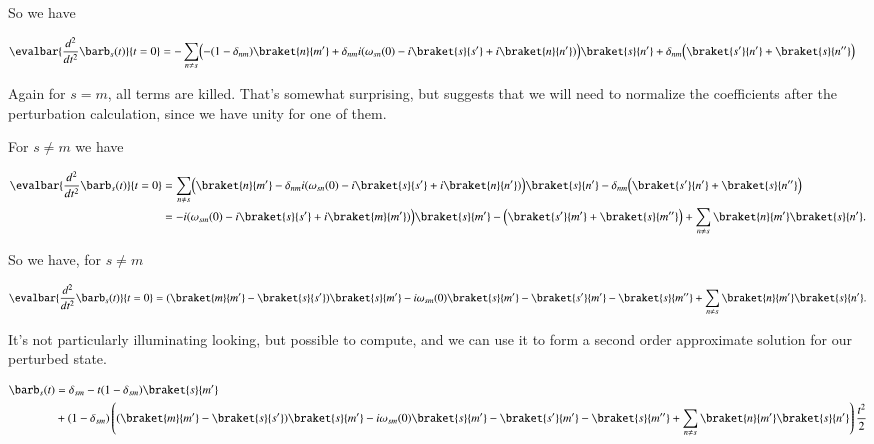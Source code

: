 So we have

\begin{align*}
\evalbar{\frac{d^2}{dt^2} \barb_s(t)}{t=0} 
&= - \sum_{n \ne s} 
\Bigl(
- (1 - \delta_{nm}) \braket{n}{m'}
+
\delta_{nm} i 
(
\omega_{sn}(0) - i\braket{s}{s'} + i\braket{n}{n'}
)
\Bigr)
\braket{s}{n'}
+\delta_{nm} 
\Bigl( 
\braket{s'}{n'}
+\braket{s}{n''}
\Bigr)
\end{align*}

Again for $s = m$, all terms are killed.  That's somewhat surprising, but suggests that we will need to normalize the coefficients after the perturbation calculation, since we have unity for one of them.

For $s \ne m$ we have

\begin{align*}
\evalbar{\frac{d^2}{dt^2} \barb_s(t)}{t=0} 
&= \sum_{n \ne s} 
\Bigl(
\braket{n}{m'}
-
\delta_{nm} i 
(
\omega_{sn}(0) - i\braket{s}{s'} + i\braket{n}{n'}
)
\Bigr)
\braket{s}{n'}
-\delta_{nm} 
\Bigl( 
\braket{s'}{n'}
+\braket{s}{n''}
\Bigr) \\
&= 
-
i 
(
\omega_{sm}(0) - i\braket{s}{s'} + i\braket{m}{m'}
)
\Bigr)
\braket{s}{m'}
-
\Bigl( 
\braket{s'}{m'}
+\braket{s}{m''}
\Bigr) 
+
\sum_{n \ne s} 
\braket{n}{m'} \braket{s}{n'}.
\end{align*}

So we have, for $s \ne m$ 

\begin{equation}\label{eqn:adiabaticApprox:330}
\evalbar{\frac{d^2}{dt^2} \barb_s(t)}{t=0} 
= 
(\braket{m}{m'} - \braket{s}{s'} ) \braket{s}{m'}
-i \omega_{sm}(0) \braket{s}{m'}
-
\braket{s'}{m'}
-\braket{s}{m''}
+
\sum_{n \ne s} 
\braket{n}{m'} \braket{s}{n'}.
\end{equation}

It's not particularly illuminating looking, but possible to compute, and we can use it to form a second order approximate solution for our perturbed state.

\begin{equation}\label{eqn:adiabaticApprox:350}
\begin{aligned}
\barb_s(t) 
&=
\delta_{sm} - t (1 - \delta_{sm}) \braket{s}{m'} \\
&+
(1 - \delta_{sm})
\left(
(\braket{m}{m'} - \braket{s}{s'} ) \braket{s}{m'}
-i \omega_{sm}(0) \braket{s}{m'}
-
\braket{s'}{m'}
-\braket{s}{m''}
+
\sum_{n \ne s} 
\braket{n}{m'} \braket{s}{n'}
\right) \frac{t^2}{2}
\end{aligned}
\end{equation}

\EndNoBibArticle
